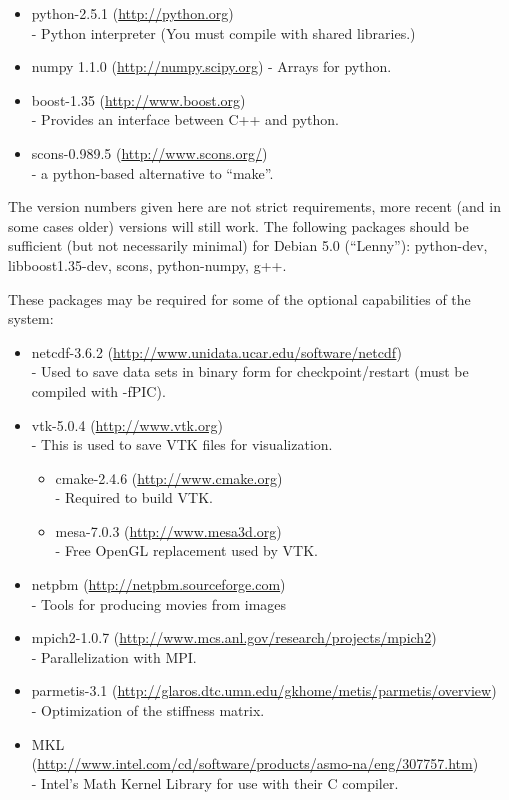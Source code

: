 \begin{itemize}
 \item python-2.5.1 (\url{http://python.org}) \\
- Python interpreter (You must compile with shared libraries.)
\item numpy 1.1.0 (\url{http://numpy.scipy.org})
- Arrays for python.
\item boost-1.35 (\url{http://www.boost.org}) \\
- Provides an interface between C++ and python.
\item scons-0.989.5 (\url{http://www.scons.org/}) \\
- a python-based alternative to ``make''.
\end{itemize}

The version numbers given here are not strict requirements, more recent (and in some cases older) versions will still work. 
The following packages should be sufficient (but not necessarily minimal) for Debian 5.0 (``Lenny''):
python-dev, libboost1.35-dev, scons, python-numpy, g++.


These packages may be required for some of the optional capabilities of the system:

\begin{itemize}
 \item netcdf-3.6.2 (\url{http://www.unidata.ucar.edu/software/netcdf}) \\-
        Used to save data sets in binary form for checkpoint/restart (must be compiled with -fPIC).
 \item vtk-5.0.4 (\url{http://www.vtk.org}) \\-
        This is used to save VTK files for visualization.
  \begin{itemize}
   \item cmake-2.4.6 (\url{http://www.cmake.org}) \\-
        Required to build VTK.
   \item mesa-7.0.3 (\url{http://www.mesa3d.org})\\-
        Free OpenGL replacement used by VTK.
  \end{itemize}
 \item netpbm (\url{http://netpbm.sourceforge.com}) \\-
        Tools for producing movies from images
 \item mpich2-1.0.7 (\url{http://www.mcs.anl.gov/research/projects/mpich2}) \\-
        Parallelization with MPI.
 \item parmetis-3.1 (\url{http://glaros.dtc.umn.edu/gkhome/metis/parmetis/overview}) \\-
        Optimization of the stiffness matrix.
 \item MKL \\(\url{http://www.intel.com/cd/software/products/asmo-na/eng/307757.htm}) \\-
        Intel's Math Kernel Library for use with their C compiler.
\end{itemize}

